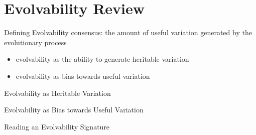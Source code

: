 \section{Evolvability Review}

\begin{frame}{Defining Evolvability}
consensus: the amount of useful variation generated by the evolutionary process
\begin{itemize}
  \item evolvability as the ability to generate heritable variation
  \item evolvability as bias towards useful variation
\end{itemize}
\end{frame}

\begin{frame}{Evolvability as Heritable Variation}
	
\end{frame}

\begin{frame}{Evolvability as Bias towards Useful Variation}
  
\end{frame}

\begin{frame}{Reading an Evolvability Signature}
  
\end{frame}
